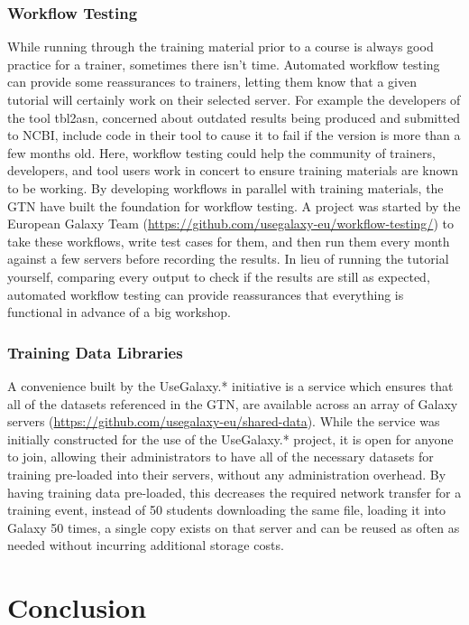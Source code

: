 \documentclass[10pt,letterpaper]{article}
\begin{document}
\subsubsection*{Workflow Testing}
While running through the training material prior to a course is always good practice for a trainer, sometimes there isn't time.
Automated workflow testing can provide some reassurances to trainers, letting them know that a given tutorial will certainly work on their selected server.
For example the developers of the tool tbl2asn, concerned about outdated results being produced and submitted to NCBI, include code in their tool to cause it to fail if the version is more than a few months old.
Here, workflow testing could help the community of trainers, developers, and tool users work in concert to ensure training materials are known to be working.
By developing workflows in parallel with training materials, the GTN have built the foundation for workflow testing. A project was started by the European Galaxy Team (\url{https://github.com/usegalaxy-eu/workflow-testing/}) to take these workflows, write test cases for them, and then run them every month against a few servers before recording the results.
In lieu of running the tutorial yourself, comparing every output to check if the results are still as expected, automated workflow testing can provide reassurances that everything is functional in advance of a big workshop.

\subsubsection*{Training Data Libraries}
A convenience built by the UseGalaxy.* initiative is a service which ensures that all of the datasets referenced in the GTN, are available across an array of Galaxy servers (\url{https://github.com/usegalaxy-eu/shared-data}).
While the service was initially constructed for the use of the UseGalaxy.* project, it is open for anyone to join, allowing their administrators to have all of the necessary datasets for training pre-loaded into their servers, without any administration overhead.
By having training data pre-loaded, this decreases the required network transfer for a training event, instead of 50 students downloading the same file, loading it into Galaxy 50 times, a single copy exists on that server and can be reused as often as needed without incurring additional storage costs.


\section*{Conclusion}
\end{document}

